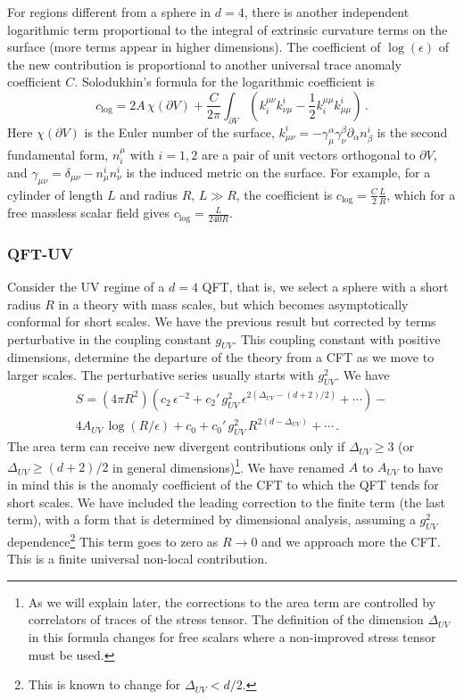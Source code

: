 \documentclass[12pt]{article}
\numberwithin{equation}{section}
\begin{document}
 For regions different from a sphere in $d=4$, there is another independent logarithmic term  proportional to the integral of extrinsic curvature terms on the surface (more terms appear in higher dimensions). The coefficient of $\log(\epsilon)$ of the new contribution is proportional to another universal trace anomaly coefficient $C$. Solodukhin's formula for the logarithmic coefficient is
\begin{equation}
c_{\textrm{log}}=2A \,\chi(\partial V)+\frac{C}{2 \pi}   \int_{\partial V}(k_i^{\mu \nu}k^i_{\nu \mu} -\frac{1}{2} k_i^{\mu \mu}k^i_{\mu \mu})\,.\label{general}
\end{equation}
Here $\chi(\partial V)$ is the Euler number of the surface,  $k^i_{\mu\nu}=-\gamma^\alpha_\mu \gamma^\beta_\nu \partial_\alpha n^i_\beta$ is 
the second fundamental form, $n^\mu_i$ with $i=1,2$ are a pair of unit vectors orthogonal to $\partial V$, and $\gamma_{\mu\nu}=\delta_{\mu\nu}-n^i_\mu n^i_\nu$ is 
the induced metric on the surface. 
For example, for a cylinder of length $L$ and radius $R$, $L\gg R$, the coefficient is $c_{\textrm{log}}=\frac{C}{2}\frac{L}{R}$, which for a free massless scalar field gives $c_{\textrm{log}}=\frac{L}{240 R}$.



\subsubsection*{QFT-UV}
Consider the UV regime of a $d=4$ QFT, that is, we select a sphere with a short radius $R$ in a theory with mass scales, but which becomes asymptotically conformal for short scales.  We have the previous result but corrected by terms perturbative in the coupling constant $g_{UV}$. This coupling constant with positive dimensions, determine the departure of the theory from a CFT as we move to larger scales. The perturbative series usually starts with $g_{UV}^2$. We have 
\begin{multline}
S=(4 \pi R^2)\left(c_2 \,\epsilon^{-2}+ c_{2}'\,g_{UV}^2 \,\epsilon^{2 \left(\Delta_{UV} -(d+2)/2\right)} +\cdots\right)- \\
4 A_{UV} \, \log(R/\epsilon) +c_0 +c_0'\, g_{UV}^2 \, R^{2(d-\Delta_{UV})}+\cdots\,.\label{uvi}
\end{multline}
The area term can receive new divergent contributions only if $\Delta_{UV}\ge 3$ (or $\Delta_{UV}\ge (d+2)/2$ in general dimensions)\footnote{As we will explain later, the corrections to the area term are controlled by correlators of traces of the stress tensor. The definition of the dimension $\Delta_{UV}$ in this formula changes for free scalars where a non-improved stress tensor must be used.}. We have renamed $A$ to $A_{UV}$ to have in mind this is the anomaly coefficient of the CFT to which the QFT tends for short scales. We have included the leading correction to the finite term (the last term), with a form that is determined by dimensional analysis,  assuming a $g_{UV}^2$ dependence\footnote{This is known to change for $\Delta_{UV}<d/2$.} This term goes to zero as $R\rightarrow 0$ and we approach more the CFT. This is a finite universal non-local contribution.  
\end{document}
